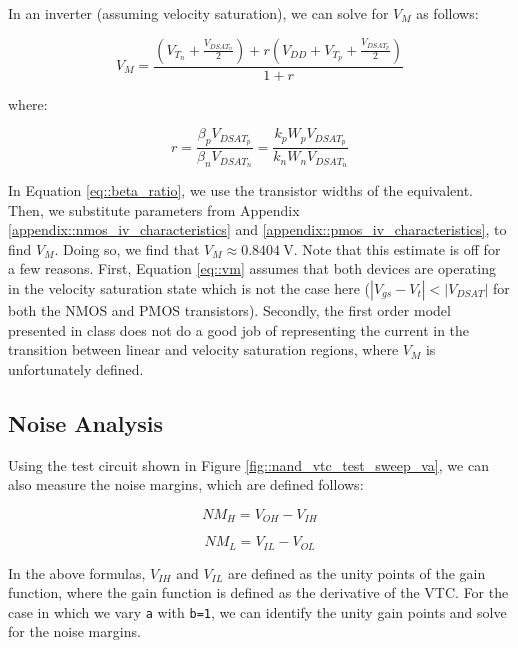 \documentclass[fleqn]{article}
\begin{document}
	In an inverter (assuming velocity saturation), we can solve for $V_M$ as follows:
	
	\begin{equation}
		\label{eq::vm}
		V_{M} = \frac{\left(V_{T_n} + \frac{V_{DSAT_n}}{2}\right) + r\left(V_{DD} + V_{T_p} + \frac{V_{DSAT_p}}{2}\right)}{1 + r}
	\end{equation}
	
	\noindent where:
	
	\begin{equation}
		\label{eq::beta_ratio}
		r = \frac{\beta_pV_{DSAT_p}}{\beta_nV_{DSAT_n}} = \frac{k_pW_pV_{DSAT_p}}{k_nW_nV_{DSAT_n}}
	\end{equation}
	
	\noindent In Equation \ref{eq::beta_ratio}, we use the transistor widths of the equivalent. Then, we substitute parameters from Appendix \ref{appendix::nmos_iv_characteristics} and \ref{appendix::pmos_iv_characteristics}, to find $V_M$. Doing so, we find that $V_M \approx 0.8404\ \text{V}$. Note that this estimate is off for a few reasons. First, Equation \ref{eq::vm} assumes that both devices are operating in the velocity saturation state which is not the case here ($|V_{gs} - V_t| < |V_{DSAT}|$ for both the NMOS and PMOS transistors). Secondly, the first order model presented in class does not do a good job of representing the current in the transition between linear and velocity saturation regions, where $V_M$ is unfortunately defined. 
	
	\subsection{Noise Analysis}
	\label{section::nand_noise_analysis}
	
	Using the test circuit shown in Figure \ref{fig::nand_vtc_test_sweep_va}, we can also measure the noise margins, which are defined follows:
	
	\begin{equation}
		NM_H = V_{OH} - V_{IH}
		\label{eq::noise_margin_high}
	\end{equation}
	
	\begin{equation}
		NM_L = V_{IL} - V_{OL}
		\label{eq::noise_margin_low}
	\end{equation}
	
	In the above formulas, $V_{IH}$ and $V_{IL}$ are defined as the unity points of the gain function, where the gain function is defined as the derivative of the VTC. For the case in which we vary \texttt{a} with \texttt{b=1}, we can identify the unity gain points and solve for the noise margins.
	
\end{document}
